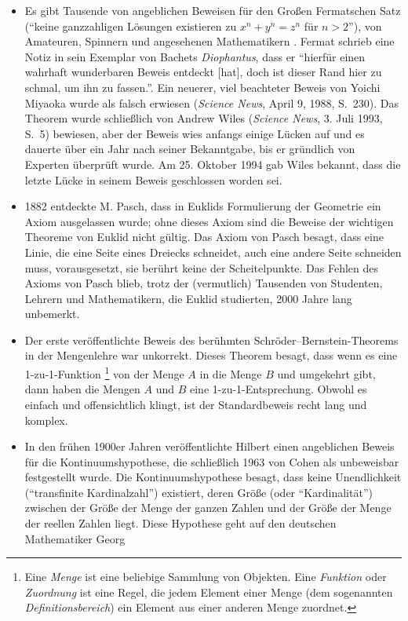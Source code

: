 \begin{itemize}
\item Es gibt Tausende von angeblichen Beweisen für den Großen Fermatschen Satz ("`keine ganzzahligen Lösungen existieren zu $x^n + y^n = z^n$ für $n > 2$"'), von Amateuren, Spinnern und angesehenen Mathematikern \cite[S.~5]{Stark}.  Fermat schrieb eine Notiz in sein Exemplar von Bachets {\em Diophantus}, dass er "`hierfür einen wahrhaft wunderbaren Beweis entdeckt [hat], doch ist dieser Rand hier zu schmal, um ihn zu fassen."'\cite[S.~507]{Kramer}.  Ein neuerer, viel beachteter Beweis von Yoichi Miyaoka wurde als falsch erwiesen ({\em Science News}, April 9, 1988, S.~230).  Das Theorem wurde schließlich von Andrew Wiles ({\em Science News}, 3. Juli 1993, S.~5) bewiesen, aber der Beweis wies anfangs einige Lücken auf und es dauerte über ein Jahr nach seiner Bekanntgabe, bis er gründlich von Experten überprüft wurde.  Am 25. Oktober 1994 gab Wiles bekannt, dass die letzte Lücke in seinem Beweis geschlossen worden sei.
\item 1882 entdeckte M. Pasch, dass in Euklids Formulierung der Geometrie ein Axiom ausgelassen wurde; ohne dieses Axiom sind die Beweise der wichtigen Theoreme von Euklid nicht gültig.  Das Axiom von Pasch besagt, dass eine Linie, die eine Seite eines Dreiecks schneidet, auch eine andere Seite schneiden muss, vorausgesetzt, sie berührt keine der Scheitelpunkte.  Das Fehlen des Axioms von Pasch blieb, trotz der (vermutlich) Tausenden von Studenten, Lehrern und Mathematikern, die Euklid studierten, 2000 Jahre lang unbemerkt.
\item Der erste veröffentlichte Beweis des berühmten Schr\"{o}der--Bernstein-Theorems in der Mengenlehre war unkorrekt\cite[p.~148]{Enderton}.  Dieses Theorem besagt, dass wenn es eine 1-zu-1-Funktion
\footnote{Eine {\em Menge} ist eine beliebige Sammlung von Objekten. Eine {\em Funktion} oder {\em Zuordnung} ist eine Regel, die jedem Element einer Menge (dem sogenannten {\em Definitionsbereich}) ein Element aus einer anderen Menge zuordnet.} 
von der Menge $A$ in die Menge $B$ und umgekehrt gibt, dann haben die Mengen $A$ und $B$ eine 1-zu-1-Entsprechung.  Obwohl es einfach und offensichtlich klingt, ist der Standardbeweis recht lang und komplex.
\item In den frühen 1900er Jahren veröffentlichte Hilbert einen angeblichen Beweis für die Kontinuumshypothese, die schließlich 1963 von Cohen als unbeweisbar festgestellt wurde\cite[S.~166]{Enderton}.  Die Kontinuumshypothese besagt, dass keine Unendlichkeit ("`transfinite Kardinalzahl"') existiert, deren Größe (oder "`Kardinalität"') zwischen der Größe der Menge der ganzen Zahlen und der Größe der Menge der reellen Zahlen liegt.  Diese Hypothese geht auf den deutschen Mathematiker Georg

\end{itemize}
